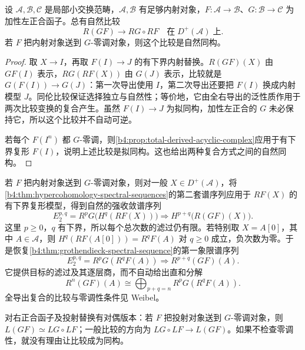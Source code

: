 \begin{theorem}\label{b4:thm:total-derived-composition}
	设 \(\mathcal A,\mathcal B,\mathcal C\) 是局部小交换范畴，\(\mathcal A,\mathcal B\) 有足够内射对象，\(F:\mathcal A\to\mathcal B\)、\(G:\mathcal B\to\mathcal C\) 为加性左正合函子。总有自然比较
	\[
		R(GF)\longrightarrow RG\circ RF \quad\text{在}\;D^+(\mathcal A)\;\text{上}.
	\]
	若 \(F\) 把内射对象送到 \(G\)-零调对象，则这个比较是自然同构。
\end{theorem}
\begin{proof}
	取 \(X\to I\)，再取 \(F(I)\to J\) 的有下界内射替换。\(R(GF)(X)\) 由 \(GF(I)\) 表示，\(RG(RF(X))\) 由 \(G(J)\) 表示，比较就是 \(G(F(I))\to G(J)\)：第一次导出使用 \(I\)，第二次导出还要把 \(F(I)\) 换成内射模型 \(J\)。同伦比较保证选择独立与自然性；等价地，它由全右导出的泛性质作用于两次比较变换的复合产生。虽然 \(F(I)\to J\) 为拟同构，加性左正合的 \(G\) 未必保持它，所以这个比较并不自动可逆。

	若每个 \(F(I^n)\) 都 \(G\)-零调，则\cref{b4:prop:total-derived-acyclic-complex}应用于有下界复形 \(F(I)\)，说明上述比较是拟同构。这也给出两种复合方式之间的自然同构。
\end{proof}

若 \(F\) 把内射对象送到 \(G\)-零调对象，则对一般 \(X\in D^+(\mathcal A)\)，将\cref{b4:thm:hypercohomology-spectral-sequences}的第二套谱序列应用于 \(RF(X)\) 的有下界复形模型，得到自然的强收敛谱序列
\[
	E_2^{p,q}=R^pG\bigl(H^q(RF(X))\bigr) \Longrightarrow H^{p+q}\bigl(R(GF)(X)\bigr).
\]
这里 \(p\ge0\)，\(q\) 有下界，所以每个总次数的滤过仍有限。若特别取 \(X=A[0]\)，其中 \(A\in\mathcal A\)，则 \(H^q(RF(A[0]))=R^qF(A)\) 对 \(q\ge0\) 成立，负次数为零。于是恢复\cref{b4:thm:grothendieck-spectral-sequence}的第一象限谱序列
\[
	E_2^{p,q}=R^pG(R^qF(A)) \Longrightarrow R^{p+q}(GF)(A).
\]
它提供目标的滤过及其逐层商，而不自动给出直和分解
\[
	R^n(GF)(A)\cong\bigoplus_{p+q=n}R^pG(R^qF(A)).
\]
全导出复合的比较与零调性条件见 Weibel\cite[Composition Theorem 10.8.2, Corollary 10.8.3]{Weibel1994HomologicalAlgebra}。

\ProseParagraphBreak
对右正合函子及投射替换有对偶版本：若 \(F\) 把投射对象送到 \(G\)-零调对象，则 \(L(GF)\simeq LG\circ LF\)；一般比较的方向为 \(LG\circ LF\to L(GF)\)。如果不检查零调性，就没有理由让比较成为同构。

